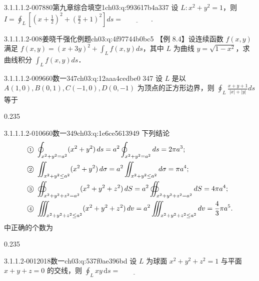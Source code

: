 \begin{q}{3.1.1.1.2-007}{880第九章综合填空1}{ch03:q:993617b4a337}
设 $L:x^2+y^2=1$，则 $\displaystyle I=\oint_L\left[\left(x+\frac{1}{2}\right)^2+\left(\frac{y}{2}+1\right)^2\right]ds=\underline{\hspace{4em}}$.
\end{q}

\begin{q}{3.1.1.1.2-008}{姜晓千强化例题}{ch03:q:4f97744b0bc5}
【例 8.4】设连续函数 $f(x,y)$ 满足 $\displaystyle f(x,y)=(x+3y)^2+\int_L f(x,y)ds$，其中 $L$ 为曲线 $y=\sqrt{1-x^2}$，求曲线积分 $\displaystyle \int_L f(x,y)ds$．
\end{q}

\begin{q}{3.1.1.1.2-009}{660数一347}{ch03:q:12aaa4cedbe0}
347 设 $L$ 是以 $A(1,0),B(0,1),C(-1,0),D(0,-1)$ 为顶点的正方形边界，则 $\displaystyle \oint_{L} \frac{x+y+1}{|x|+|y|} ds$ 等于
\begin{opts}{0.235}
\hfill{}\hfill{}\hfill{}
\end{opts}
\end{q}

\begin{q}{3.1.1.1.2-010}{660数一349}{ch03:q:1e6ce5613949}
下列结论
\[
\begin{aligned}
\text{\ensuremath{\text{\textcircled{\scriptsize 1}}} }&\oint_{x^2+y^2=a^2}(x^2+y^2)\,ds
 =a^2\oint_{x^2+y^2=a^2}ds=2\pi a^3;\\
\text{\ensuremath{\text{\textcircled{\scriptsize 2}}} }&\iint_{x^2+y^2\le a^2}(x^2+y^2)\,d\sigma
 =a^2\iint_{x^2+y^2\le a^2}d\sigma=\pi a^4;\\
\text{\ensuremath{\text{\textcircled{\scriptsize 3}}} }&\oiint_{x^2+y^2+z^2=a^2}(x^2+y^2+z^2)\,dS
 =a^2\oiint_{x^2+y^2+z^2=a^2}dS=4\pi a^4;\\
\text{\ensuremath{\text{\textcircled{\scriptsize 4}}} }&\iiint_{x^2+y^2+z^2\le a^2}(x^2+y^2+z^2)\,dv
 =a^2\iiint_{x^2+y^2+z^2\le a^2}dv=\frac{4}{3}\pi a^5.
\end{aligned}
\]
中正确的个数为
\begin{opts}{0.235}
\hfill{}\hfill{}\hfill{}
\end{opts}
\end{q}

\par\addvspace{2.4ex}\noindent
\begin{minipage}{\linewidth}

\begin{q}{3.1.1.2-001}{2018数一}{ch03:q:537f0ae396bd}
设 $L$ 为球面 $x^2+y^2+z^2=1$ 与平面 $x+y+z=0$ 的交线，则 $\displaystyle \oint_L xy\,\mathrm{d}s=\underline{\hspace{4em}}$
\end{q}
\end{minipage}


